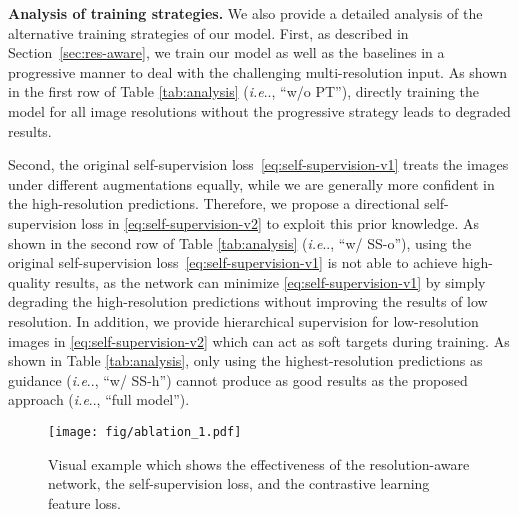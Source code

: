 \documentclass[runningheads]{llncs}
\makeatletter
\DeclareRobustCommand\onedot{\futurelet\@let@token\@onedot}
\def\@onedot{\ifx\@let@token.\else.\null\fi\xspace}
\def\ie{\emph{i.e}\onedot, } \def\Ie{\emph{I.e}\onedot}
\makeatother
\begin{document}
\noindent \textbf{Analysis of training strategies.}
We also provide a detailed analysis of the alternative training strategies of our model. 
First, as described in Section~\ref{sec:res-aware}, we train our model as well as the baselines in a progressive manner to deal with the challenging multi-resolution input.
As shown in the first row of Table \ref{tab:analysis} (\ie ``w/o PT''), directly training the model for all image resolutions without the progressive strategy leads to degraded results.

Second, the original self-supervision loss~\eqref{eq:self-supervision-v1} treats the images under different augmentations equally, while we are generally more confident in the high-resolution predictions. 
Therefore, we propose a directional self-supervision loss in \eqref{eq:self-supervision-v2} to exploit this prior knowledge.
As shown in the second row of Table \ref{tab:analysis} (\ie ``w/ SS-o''), using the original self-supervision loss~\eqref{eq:self-supervision-v1} is not able to achieve high-quality results, as the network can minimize \eqref{eq:self-supervision-v1} by simply degrading the high-resolution predictions without improving the results of low resolution. 
In addition, we provide hierarchical supervision for low-resolution images in \eqref{eq:self-supervision-v2} which can act as soft targets during training.
As shown in Table \ref{tab:analysis}, only using the highest-resolution predictions as guidance (\ie ``w/ SS-h'') cannot produce as good results as the proposed approach (\ie ``full model'').









\begin{figure}[t]
	\centering
	\texttt{[image: fig/ablation\_1.pdf]} 
\caption{Visual example which shows the effectiveness of the resolution-aware network, the self-supervision loss, and the contrastive learning feature loss.}
\label{fig:visual_ablation}
\end{figure}
\end{document}
